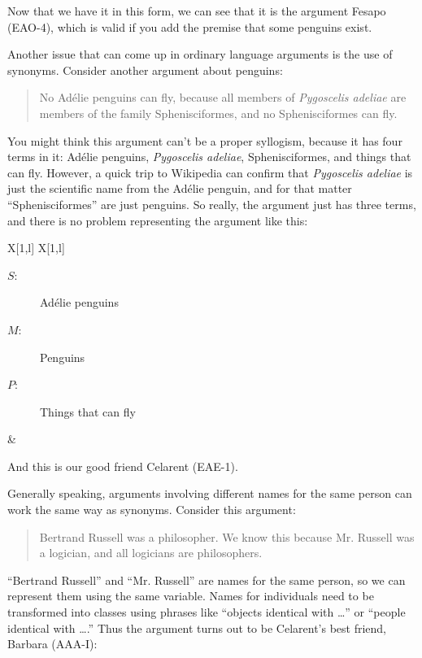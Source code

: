 Now that we have it in this form, we can see that it is the argument Fesapo (EAO-4), which is valid if you add the premise that some penguins exist.

Another issue that can come up in ordinary language arguments is the use of synonyms. Consider another argument about penguins:

\begin{quotation}
\noindent No Ad\'{e}lie penguins can fly, because all members of \emph{Pygoscelis adeliae} are members of the family Sphenisciformes, and no Sphenisciformes can fly.
\end{quotation}

You might think this argument can't be a proper syllogism, because it has four terms in it: Ad\'{e}lie penguins, \emph{Pygoscelis adeliae}, Sphenisciformes, and things that can fly. However, a quick trip to Wikipedia can confirm that \emph{Pygoscelis adeliae} is just the scientific name from the Ad\'{e}lie penguin, and for that matter ``Sphenisciformes'' are just penguins. So really, the argument just has three terms, and there is no problem representing the argument  like this:

\begin{tabu}{{X[1,l] X[1,l]}}
\begin{description}
\item[$S$:] Ad\'{e}lie penguins
\item[$M$:] Penguins
\item[$P$:] Things that can fly
\end{description}
&
\begin{kormanize}
\end{kormanize}
\end{tabu}

And this is our good friend Celarent (EAE-1).

Generally speaking, arguments involving different names for the same person can work the same way as synonyms. Consider this argument:

\begin{quotation}
\noindent Bertrand Russell was a philosopher. We know this because Mr. Russell was a logician, and all logicians are philosophers.
\end{quotation}

``Bertrand Russell'' and ``Mr. Russell'' are names for the same person, so we can represent them using the same variable. Names for individuals need to be transformed into classes using phrases like ``objects identical with \ldots'' or ``people identical with \ldots.''  Thus the argument turns out to be Celarent's best friend, Barbara (AAA-I):


